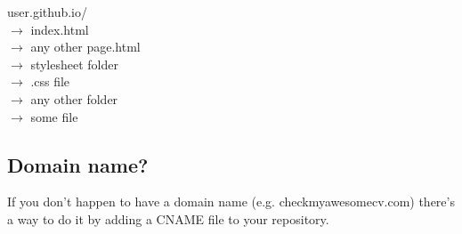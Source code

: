 \documentclass[a4paper,11pt]{article}
\begin{document}
\begin{spacing}{1.1}
user.github.io/ \\
     \qquad  $\rightarrow$ index.html \\
     \qquad  $\rightarrow$ any other page.html \\
     \qquad  $\rightarrow$ stylesheet folder \\
     \quad \quad \qquad $\rightarrow$ .css file \\
     \qquad  $\rightarrow$ any other folder \\
     \quad \quad \qquad $\rightarrow$ some file \\
\end{spacing}

\subsection{Domain name?}
If you don't happen to have a domain name (e.g. checkmyawesomecv.com) there's a way to do it by adding a CNAME file to your repository.
    
\end{document}
